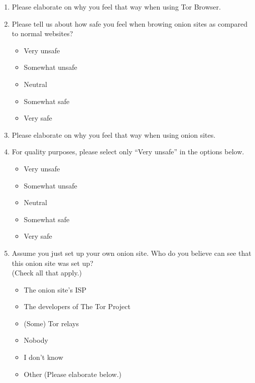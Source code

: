 \begin{enumerate}
    \item Please elaborate on why you feel that way when using Tor Browser.

    \item Please tell us about how safe you feel when browing onion sites as
        compared to normal websites?
        \begin{itemize}[label=$\Circle$]
            \item Very unsafe
            \item Somewhat unsafe
            \item Neutral
            \item Somewhat safe
            \item Very safe
        \end{itemize}

    \item Please elaborate on why you feel that way when using onion sites.

    \item For quality purposes, please select only ``Very unsafe'' in the options
        below.
        \begin{itemize}[label=$\Circle$]
            \item Very unsafe
            \item Somewhat unsafe
            \item Neutral
            \item Somewhat safe
            \item Very safe
        \end{itemize}

    \item Assume you just set up your own onion site. Who do you believe can
        see that this onion site was set up?\\(Check all that apply.)
        \begin{itemize}[label=$\Square$]
            \item The onion site's ISP
            \item The developers of The Tor Project
            \item (Some) Tor relays
            \item Nobody
            \item I don't know
            \item Other (Please elaborate below.)
        \end{itemize}


\end{enumerate}
